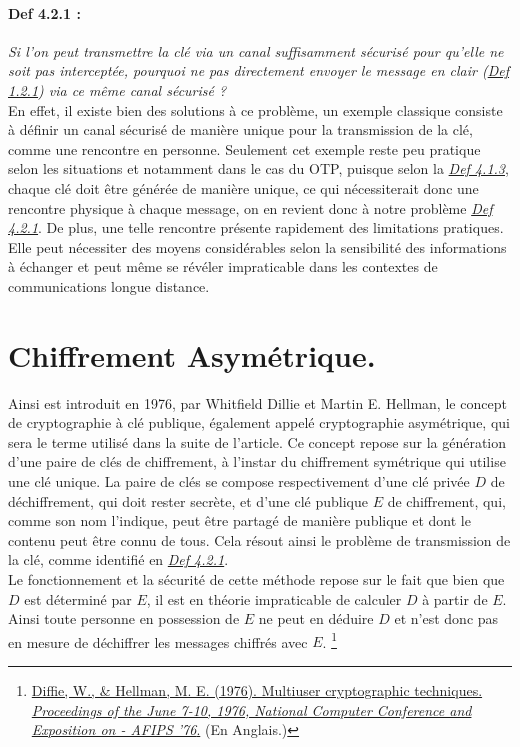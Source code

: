 \documentclass{article}
\begin{document}
\paragraph{Def 4.2.1 :}\label{def-4.2.1}

\textit{Si l'on peut transmettre la clé via un canal suffisamment sécurisé
	pour qu'elle ne soit pas interceptée, pourquoi ne pas directement
	envoyer le message en clair (\hyperref[def-1.2.1]{Def 1.2.1}) via ce même
	canal sécurisé ?} \\

En effet, il existe bien des solutions à ce problème, un exemple
classique consiste à définir un canal sécurisé de manière unique pour la
transmission de la clé, comme une rencontre en personne. Seulement cet
exemple reste peu pratique selon les situations et notamment dans le cas
du OTP, puisque selon la \textit{\hyperref[def-4.1.3]{Def 4.1.3}},
chaque clé doit être générée de manière unique, ce qui nécessiterait
donc une rencontre physique à chaque message, on en revient donc à notre
problème \textit{\hyperref[def-4.2.1]{Def 4.2.1}}. De plus, une telle
rencontre présente rapidement des limitations pratiques. Elle peut
nécessiter des moyens considérables selon la sensibilité des
informations à échanger et peut même se révéler impraticable dans les
contextes de communications longue distance.

\section{Chiffrement Asymétrique.}\label{chiffrement-asymuxe9trique-et-algorithme-rsa.}

Ainsi est introduit en 1976, par Whitfield Dillie et Martin E. Hellman,
le concept de cryptographie à clé publique, également appelé
cryptographie asymétrique, qui sera le terme utilisé dans la suite de
l'article. Ce concept repose sur la génération d'une paire de clés de
chiffrement, à l'instar du chiffrement symétrique qui utilise une clé
unique. La paire de clés se compose respectivement d'une clé privée
\(D\) de déchiffrement, qui doit rester secrète, et d'une clé publique
\(E\) de chiffrement, qui, comme son nom l'indique, peut être partagé de
manière publique et dont le contenu peut être connu de tous. Cela résout
ainsi le problème de transmission de la clé, comme identifié en
\textit{\hyperref[def-4.2.1]{Def 4.2.1}}. \\

Le fonctionnement et la sécurité de cette méthode repose sur le fait que
bien que \(D\) est déterminé par \(E\), il est en théorie impraticable
de calculer \(D\) à partir de \(E\). Ainsi toute personne en possession
de \(E\) ne peut en déduire \(D\) et n'est donc pas en mesure de
déchiffrer les messages chiffrés avec \(E\).
\footnote{\href{https://dl.acm.org/doi/pdf/10.1145/1499799.1499815}{Diffie,
		W., \& Hellman, M. E. (1976). Multiuser cryptographic techniques.
		\textit{Proceedings of the June 7-10, 1976, National Computer Conference
			and Exposition on - AFIPS '76}.} (En Anglais.)} \\
\end{document}

